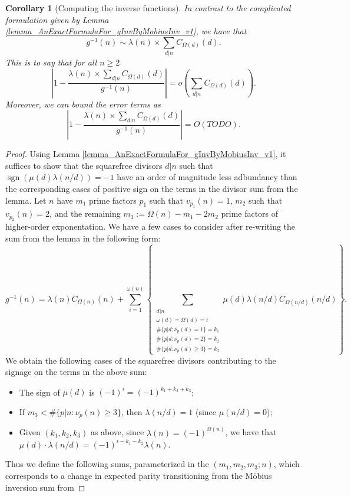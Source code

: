 \documentclass[11pt,reqno,a4letter]{article}
\numberwithin{figure}{section}
\numberwithin{table}{section}
\theoremstyle{plain}
\newtheorem{cor}[theorem]{Corollary}
\numberwithin{theorem}{section}
\theoremstyle{definition}
\begin{document}
\begin{cor}[Computing the inverse functions] 
In contrast to the complicated formulation given by 
Lemma \ref{lemma_AnExactFormulaFor_gInvByMobiusInv_v1}, we have that 
\[
g^{-1}(n) \sim \lambda(n) \times \sum_{d|n} C_{\Omega(d)}(d). 
\]
This is to say that for all $n \geq 2$ 
\[
\left\lvert 1 - \frac{\lambda(n) \times \sum_{d|n} C_{\Omega(d)}(d)}{g^{-1}(n)} \right\rvert = 
     o\left(\sum_{d|n} C_{\Omega(d)}(d)\right). 
\]
Moreover, we can bound the error terms as 
\[
\left\lvert 1 - \frac{\lambda(n) \times \sum_{d|n} C_{\Omega(d)}(d)}{g^{-1}(n)} \right\rvert = 
     O\left(TODO\right). 
\]
\end{cor} 
\begin{proof} 
Using Lemma \ref{lemma_AnExactFormulaFor_gInvByMobiusInv_v1}, it suffices to show that 
the squarefree divisors $d|n$ such that $\operatorname{sgn}(\mu(d) \lambda(n/d)) = -1$ 
have an order of magnitude less adbundancy than the corresponding cases of positive sign on 
the terms in the divisor sum from the lemma. Let $n$ have $m_1$ prime factors $p_1$ such that 
$v_{p_1}(n) = 1$, $m_2$ such that $v_{p_2}(n) = 2$, and the remaining 
$m_3 := \Omega(n) - m_1 - 2m_2$ prime factors of higher-order exponentation. 
We have a few cases to consider after re-writing the sum from the lemma in the following form: 
\[
g^{-1}(n) = \lambda(n) C_{\Omega(n)}(n) + \sum_{i=1}^{\omega(n)} \left\{
     \sum_{\substack{d|n \\ \omega(d) = \Omega(d) = i \\ \#\{p|d:\nu_p(d) = 1\} = k_1 \\ 
     \#\{p|d:\nu_p(d) = 2\} = k_2 \\ \#\{p|d:\nu_p(d) \geq 3\} = k_3}} 
     \mu(d) \lambda(n/d) C_{\Omega(n/d)}(n/d) \right\}. 
\]
We obtain the following cases of the squarefree divisors contributing to the signage on the 
terms in the above sum: 
\begin{itemize} 
\item The sign of $\mu(d)$ is $(-1)^{i} = (-1)^{k_1+k_2+k_3}$; 
\item If $m_3 < \#\{p|n: \nu_p(n) \geq 3\}$, then $\lambda(n/d) = 1$ (since $\mu(n/d) = 0$); 
\item Given $(k_1, k_2, k_3)$ as above, since $\lambda(n) = (-1)^{\Omega(n)}$, we have that 
      $\mu(d) \cdot \lambda(n/d) = (-1)^{i-k_1-k_2} \lambda(n)$. 
\end{itemize} 
Thus we define the following sums, parameterized in the $(m_1,m_2,m_3; n)$, which corresponds to a 
change in expected parity transitioning from the M\"obius inversion sum from 

\end{proof}
\end{document}

